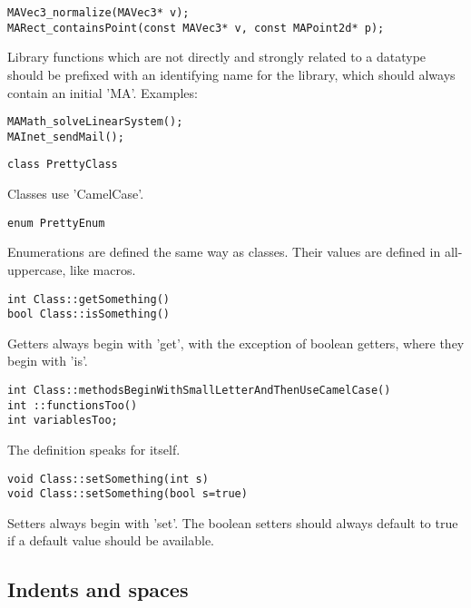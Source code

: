 \documentclass {article}
\begin{document}
\begin{verbatim} 
MAVec3_normalize(MAVec3* v);
MARect_containsPoint(const MAVec3* v, const MAPoint2d* p);
\end{verbatim}

Library functions which are not directly and strongly related to a datatype should be prefixed with an identifying name for the library, which should always contain an initial 'MA'. Examples: 

\begin{verbatim}
MAMath_solveLinearSystem();
MAInet_sendMail();
\end{verbatim}

\begin{verbatim} 
class PrettyClass
\end{verbatim}

Classes use 'CamelCase'.

\begin{verbatim} 
enum PrettyEnum
\end{verbatim}

Enumerations are defined the same way as classes. Their values are defined in all-uppercase, like macros.

\begin{verbatim} 
int Class::getSomething()
bool Class::isSomething()
\end{verbatim}

Getters always begin with 'get', with the exception of boolean getters, where they begin with 'is'.

\begin{verbatim} 
int Class::methodsBeginWithSmallLetterAndThenUseCamelCase()
int ::functionsToo()
int variablesToo;
\end{verbatim}

The definition speaks for itself.

\begin{verbatim} 
void Class::setSomething(int s)
void Class::setSomething(bool s=true)
\end{verbatim}

Setters always begin with 'set'. The boolean setters should always default to true if a default value should be available.

\setlength{\parskip}{12pt}
\setlength{\parindent}{0pt}

\subsection{Indents and spaces}
\end{document}
